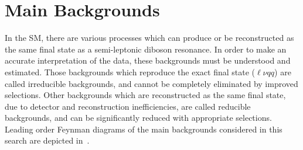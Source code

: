 %
\section{Main Backgrounds}
\label{ch:analysisStrategy:bkgs}
In the SM, there are various processes which can produce or be reconstructed as the same final state as a semi-leptonic diboson resonance. In order to make an accurate interpretation of the data, these backgrounds must be understood and estimated. Those backgrounds which reproduce the exact final state ($\ell\nu qq$) are called irreducible backgrounds, and cannot be completely eliminated by improved selections. Other backgrounds which are reconstructed as the same final state, due to detector and reconstruction inefficiencies, are called reducible backgrounds, and can be significantly reduced with appropriate selections. Leading order Feynman diagrams of the main backgrounds considered in this search are depicted in~\Fig{\ref{fig:bkg_feyn_lo}}.


